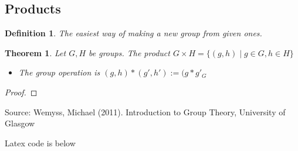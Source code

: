 \documentclass{article}
\theoremstyle{plain}
\newtheorem{theorem}{Theorem}
\newtheorem{definition}{Definition}
\begin{document}
\subsection{Products}
\begin{definition}
    The easiest way of making a new group from given ones.
\end{definition}

\begin{theorem}
    Let \(G, H\) be groups. The product \(G \times H = \{(g, h) \mid g \in G, h \in H \}\)
    \begin{itemize}
        \item The group operation is \((g, h) * (g', h') := (g * g'_G\)
    \end{itemize}
\end{theorem}

\begin{proof}
    
\end{proof}

Source: 
  Wemyss, Michael (2011). Introduction to Group Theory, University of Glasgow

Latex code is below
\end{document}
